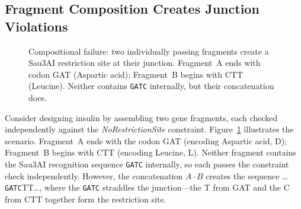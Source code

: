 \documentclass[acmsmall,review,anonymous]{acmart}
\newcommand{\PASS}{\ensuremath{\mathsf{PASS}}\xspace}
\newcommand{\FAIL}{\ensuremath{\mathsf{FAIL}}\xspace}
\begin{document}
\subsection{Fragment Composition Creates Junction Violations}

\begin{figure}[t]
\centering
{}
\caption{Compositional failure: two individually passing fragments
         create a Sau3AI restriction site at their junction.
         Fragment~A ends with codon GAT (Aspartic acid); Fragment~B
         begins with CTT (Leucine). Neither contains \texttt{GATC}
         internally, but their concatenation does.}
\label{fig:junction}
\end{figure}

Consider designing insulin by assembling two gene fragments, each
checked independently against the \emph{NoRestrictionSite} constraint.
Figure~\ref{fig:junction} illustrates the scenario.
Fragment~A ends with the codon GAT (encoding Aspartic acid, D);
Fragment~B begins with CTT (encoding Leucine, L).
Neither fragment contains the Sau3AI recognition sequence
\texttt{GATC} internally, so each passes the constraint check
independently.
However, the concatenation $A \cdot B$ creates the sequence
\dots\texttt{GATC}TT\dots, where the \texttt{GATC} straddles the
junction---the T from GAT and the C from CTT together form the
restriction site.
\end{document}
